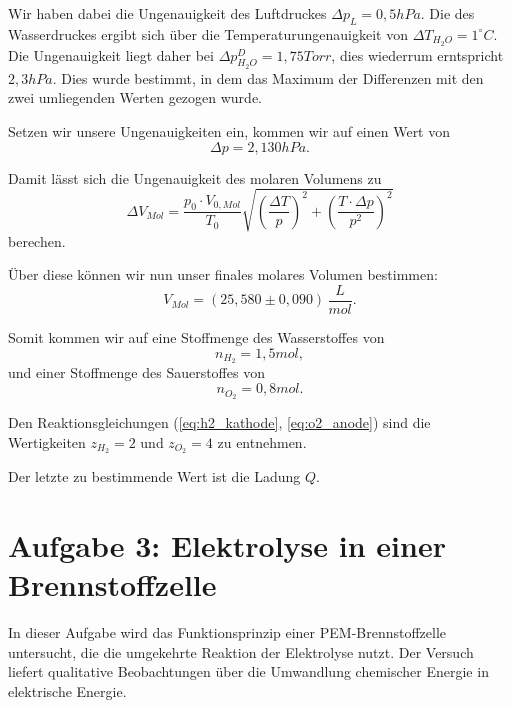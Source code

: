 Wir haben dabei die Ungenauigkeit des Luftdruckes $\Delta p_L = 0,5 hPa$. Die des Wasserdruckes ergibt sich über die Temperaturungenauigkeit von $\Delta T_{H_2O} =1^\circ C$.
Die Ungenauigkeit liegt daher bei $\Delta p_{H_2O}^D = 1,75 Torr$, dies wiederrum erntspricht $2,3 hPa$. Dies wurde bestimmt, in dem das Maximum der Differenzen mit den zwei umliegenden Werten gezogen wurde.

Setzen wir unsere Ungenauigkeiten ein, kommen wir auf einen Wert von
\begin{equation}
    \Delta p = 2,130 hPa.
\end{equation}

Damit lässt sich die Ungenauigkeit des molaren Volumens zu 
\begin{equation}
    \Delta V_{Mol} = \frac{p_0 \cdot V_{0,Mol}}{T_0} \sqrt{\left(\frac{\Delta T}{p}\right)^2 + \left(\frac{T \cdot \Delta p}{p^2}\right)^2}
\end{equation}  
berechen.

Über diese können wir nun unser finales molares Volumen bestimmen:
\begin{equation}
\boxed{
    V_{Mol} = (25,580 \pm 0,090)\, \frac{L}{mol}.
}
\end{equation}

Somit kommen wir auf eine Stoffmenge des Wasserstoffes von
\begin{equation}
    n_{H_2} = 1,5 mol, 
\end{equation}
und einer Stoffmenge des Sauerstoffes von 
\begin{equation}
    n_{O_2} = 0,8 mol.
\end{equation}

Den Reaktionsgleichungen (\ref*{eq:h2_kathode}, \ref*{eq:o2_anode}) sind die Wertigkeiten $z_{H_2} = 2$ und $z_{O_2} = 4$ zu entnehmen.

Der letzte zu bestimmende Wert ist die Ladung $Q$.



\section{Aufgabe 3: Elektrolyse in einer Brennstoffzelle}

In dieser Aufgabe wird das Funktionsprinzip einer PEM-Brennstoffzelle untersucht, die die umgekehrte Reaktion der Elektrolyse nutzt. Der Versuch liefert qualitative Beobachtungen über die Umwandlung chemischer Energie in elektrische Energie.

